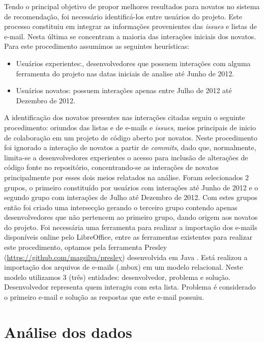 \documentclass[oneside,brazil,a4paper]{normas-utf-tex}
\begin{document}
Tendo o principal objetivo de propor melhores resultados para novatos no sistema de recomendação, foi necessário identificá-los entre usuários do projeto. Este processo constituiu em integrar as informações provenientes das \textit{issues} e listas de e-mail. Nesta última se concentram a maioria das interações iniciais dos novatos. Para este procedimento assumimos as seguintes heurísticas:

\begin{itemize}
    \item Usuários experientes:, desenvolvedores que possuem interações com alguma ferramenta do projeto nas datas iniciais de analise até Junho de 2012.
    \item Usuários novatos: possuem interações apenas entre Julho de 2012 até Dezembro de 2012.
\end{itemize}

A identificação dos novatos presentes nas interações citadas seguiu o seguinte procedimento: oriundos das listas e de e-mails e \textit{issues}, meios principais de inicio de colaboração em um projeto de código aberto por novatos. Neste procedimento foi ignorado a interação de novatos a partir de \textit{commits}, dado que, normalmente, limita-se a desenvolvedores experientes o acesso para inclusão de alterações de código fonte no repositório, concentrando-se as interações de novatos principalmente por esses dois meios relatados na análise. Foram selecionados 2 grupos, o primeiro constituído por usuários com interações até Junho de 2012 e o segundo grupo com interações de Julho até Dezembro de 2012. Com estes grupos então foi criado uma intersecção gerando o terceiro grupo contendo apenas desenvolvedores que não pertencem ao primeiro grupo, dando origem aos novatos do projeto. Foi necessária uma ferramenta para realizar a importação dos e-mails disponíveis online pelo LibreOffice, entre as ferramentas existentes para realizar este procedimento, optamos pela ferramenta Presley (\url{https://github.com/magsilva/presley}) desenvolvida em Java \cite{Trindade-etal:2009}. Está realizou a importação dos arquivos de e-mails (.mbox) em um modelo relacional. Neste modelo utilizamos 3 (três) entidades: desenvolvedor, problema e solução. Desenvolvedor representa quem interagiu com esta lista. Problema é considerado o primeiro e-mail e solução as respostas que este e-mail possuiu. 


\section{Análise dos dados}
\end{document}
